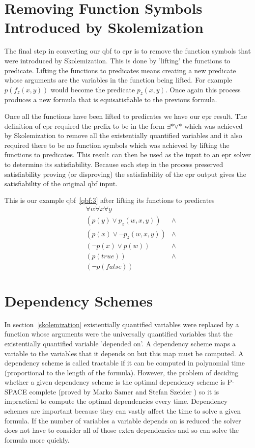 \section{Removing Function Symbols Introduced by Skolemization}
The final step in converting our \gls{qbf} to \gls{epr} is to remove the function symbols that were introduced by Skolemization. This is done by 'lifting' the functions to predicate. Lifting the functions to predicates means creating a new predicate whose arguments are the variables in the function being lifted. For example $p(f_z(x, y))$ would become the predicate $p_z(x, y)$. Once again this process produces a new formula that is equisatisfiable to the previous formula.

Once all the functions have been lifted to predicates we have our \gls{epr} result. The definition of \gls{epr} required the prefix to be in the form $\exists * \forall *$ which was achieved by Skolemization to remove all the existentially quantified variables and it also required there to be no function symbols which was achieved by lifting the functions to predicates. This result can then be used as the input to an \gls{epr} solver to determine its satisfiability. Because each step in the process preserved satisfiability proving (or disproving) the satisfiability of the \gls{epr} output gives the satisfiability of the original \gls{qbf} input.

This is our example \gls{qbf}~\ref{qbf:3} after lifting its functions to predicates
\begin{equation} \label{qbf:3}
\begin{aligned}
&\forall w \forall x \forall y\\
&(p(y) \lor p_z(w, x, y)) &\land\\
&(p(x) \lor \neg p_z(w, x, y)) &\land\\
&(\neg p(x) \lor p(w)) &\land\\
&(p(true)) &\land\\
&(\neg p(false))
\end{aligned}
\end{equation}

\section{Dependency Schemes} \label{dependencyschemes}
In section~\ref{skolemization} existentially quantified variables were replaced by a function whose arguments were the universally quantified variables that the existentially quantified variable 'depended on'. A dependency scheme maps a variable to the variables that it depends on but this map must be computed. A dependency scheme is called tractable if it can be computed in polynomial time (proportional to the length of the formula). However, the problem of deciding whether a given dependency scheme is the optimal dependency scheme is P-SPACE complete (proved by Marko Samer and Stefan Szeider \cite{backdoorsets}) so it is impractical to compute the optimal dependencies every time.
Dependency schemes are important because they can vastly affect the time to solve a given formula. If the number of variables a variable depends on is reduced the solver does not have to consider all of those extra dependencies and so can solve the formula more quickly.

